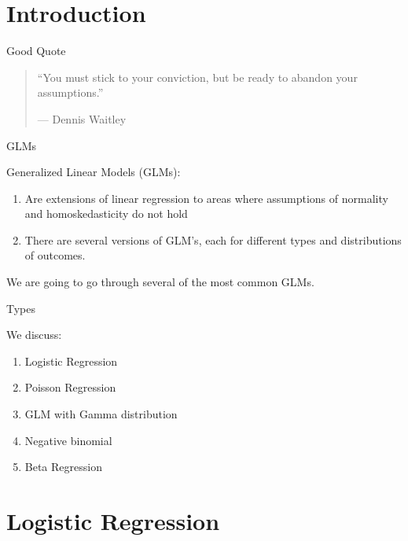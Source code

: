 \section{Introduction}\label{introduction}

\begin{frame}{Good Quote}

\begin{quote}
``You must stick to your conviction, but be ready to abandon your
assumptions.''

--- Dennis Waitley
\end{quote}

\end{frame}

\begin{frame}{GLMs}

Generalized Linear Models (GLMs):

\begin{enumerate}
\def\labelenumi{\arabic{enumi}.}
\tightlist
\item
  Are extensions of linear regression to areas where assumptions of
  normality and homoskedasticity do not hold
\item
  There are several versions of GLM's, each for different types and
  distributions of outcomes.
\end{enumerate}

We are going to go through several of the most common GLMs.

\end{frame}

\begin{frame}{Types}

We discuss:

\begin{enumerate}
\def\labelenumi{\arabic{enumi}.}
\tightlist
\item
  Logistic Regression
\item
  Poisson Regression
\item
  GLM with Gamma distribution
\item
  Negative binomial
\item
  Beta Regression
\end{enumerate}

\end{frame}

\section{Logistic Regression}\label{logistic-regression}

